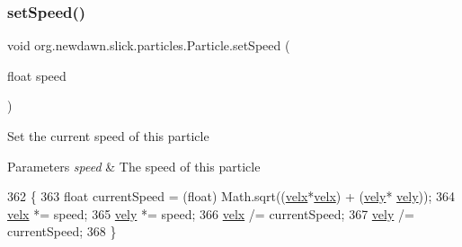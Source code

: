 \subsubsection{\texorpdfstring{set\+Speed()}{setSpeed()}}
{\footnotesize\ttfamily void org.\+newdawn.\+slick.\+particles.\+Particle.\+set\+Speed (\begin{DoxyParamCaption}\item[{float}]{speed }\end{DoxyParamCaption})\hspace{0.3cm}{\ttfamily [inline]}}

Set the current speed of this particle


\begin{DoxyParams}{Parameters}
{\em speed} & The speed of this particle \\
\hline
\end{DoxyParams}

\begin{DoxyCode}
362                                       \{
363         \textcolor{keywordtype}{float} currentSpeed = (float) Math.sqrt((\mbox{\hyperlink{classorg_1_1newdawn_1_1slick_1_1particles_1_1_particle_a9056abd13cffd1064051f9a34a3e70ef}{velx}}*\mbox{\hyperlink{classorg_1_1newdawn_1_1slick_1_1particles_1_1_particle_a9056abd13cffd1064051f9a34a3e70ef}{velx}}) + (\mbox{\hyperlink{classorg_1_1newdawn_1_1slick_1_1particles_1_1_particle_a799a64a459185f49bcf1e71a53e59014}{vely}}*
      \mbox{\hyperlink{classorg_1_1newdawn_1_1slick_1_1particles_1_1_particle_a799a64a459185f49bcf1e71a53e59014}{vely}}));
364         \mbox{\hyperlink{classorg_1_1newdawn_1_1slick_1_1particles_1_1_particle_a9056abd13cffd1064051f9a34a3e70ef}{velx}} *= speed;
365         \mbox{\hyperlink{classorg_1_1newdawn_1_1slick_1_1particles_1_1_particle_a799a64a459185f49bcf1e71a53e59014}{vely}} *= speed;
366         \mbox{\hyperlink{classorg_1_1newdawn_1_1slick_1_1particles_1_1_particle_a9056abd13cffd1064051f9a34a3e70ef}{velx}} /= currentSpeed;
367         \mbox{\hyperlink{classorg_1_1newdawn_1_1slick_1_1particles_1_1_particle_a799a64a459185f49bcf1e71a53e59014}{vely}} /= currentSpeed;
368     \}
\end{DoxyCode}
\mbox{\label{classorg_1_1newdawn_1_1slick_1_1particles_1_1_particle_a3562191e55295976547113c473af0609}} 
